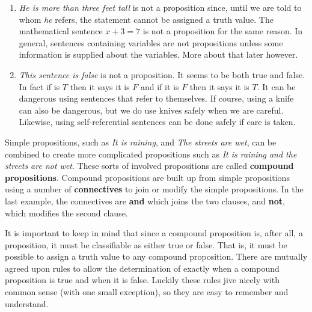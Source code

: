 \begin{enumerate}
\item {\itshape He is more than three feet tall} is not a proposition since, until we are told to whom {\itshape he}
refers, the statement cannot be assigned a truth value. The mathematical sentence $x+3 = 7$ is not a proposition for the
same reason. In general, sentences containing variables are not propositions unless some information is supplied about
the variables. More about that later however.

\item {\itshape This sentence is false} is not a proposition. It seems to be both true and false.
 In fact if is $T$ then it says it is 
$F$ and if it is $F$ then it says it is $T$. It can be dangerous using sentences that refer to themselves. 
If course, using a knife can also be dangerous, but we do use knives safely when we are careful. Likewise,
using self-referential sentences can be done safely if care is taken.
\end{enumerate}

 Simple propositions, such as {\itshape It is raining}, and {\itshape The streets are
wet}, can be combined to create more complicated propositions such as {\itshape It is
raining and the streets are not wet}. These sorts of involved propositions are
called {\bfseries compound propositions}. Compound propositions are built up from simple
propositions using a number of {\bfseries connectives} to join or modify the simple
propositions. In the last example, the connectives are {\bfseries and} which joins the
two clauses, and {\bfseries not}, which modifies the second clause.

It is important to keep in mind that since a compound proposition is,
after all, a proposition, it must be classifiable as either true or false. That
is, it must be possible to assign a truth value to any compound proposition.
There are mutually agreed upon rules to allow the determination of exactly when a
compound proposition is true and when it is false. Luckily these rules jive nicely
with common sense (with one small exception), so they are easy to remember and understand.


